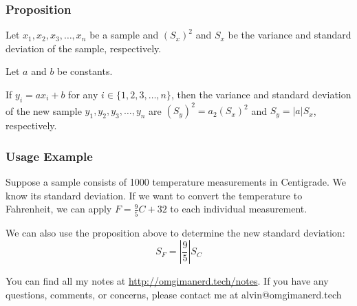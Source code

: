 \documentclass[letterpaper, 12pt]{math}
\begin{document}
\subsubsection*{Proposition}
Let \( x_{1}, x_{2}, x_{3}, \dots, x_{n} \) be a sample and
\( (S_{x})^{2} \) and \( S_{x} \) be the variance and standard deviation
of the sample, respectively. \par
Let \( a \) and \( b \) be constants. \par
If \( y_{i} = ax_{i}+b \) for any \( i \in \{1, 2, 3, \dots, n\} \),
then the variance and standard deviation of the new sample
\( y_{1}, y_{2}, y_{3}, \dots, y_{n} \) are
\( (S_{y})^{2} = a_{2}(S_{x})^{2} \) and \( S_{y} = |a|S_{x} \), respectively.

\subsubsection*{Usage Example}
Suppose a sample consists of 1000 temperature measurements in Centigrade.
We know its standard deviation. If we want to convert the temperature to
Fahrenheit, we can apply \( F = \frac{9}{5}C + 32 \) to each individual
measurement. \par
We can also use the proposition above to determine the new standard deviation:
\[ S_{F} = |\frac{9}{5}|S_{C} \]

\begin{center}
  You can find all my notes at \url{http://omgimanerd.tech/notes}. If you have
  any questions, comments, or concerns, please contact me at
  alvin@omgimanerd.tech
\end{center}
\end{document}
